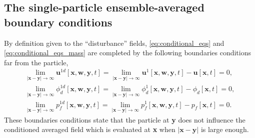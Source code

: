 \subsection{The single-particle ensemble-averaged boundary conditions}


By definition given to the ``disturbance'' fields, \ref{eq:conditional_eqs} and \ref{eq:conditional_eqs_mass} are completed by the following boundaries conditions far from the particle, 
\begin{align}
    \lim_{|\textbf{x}-\textbf{y}|\to\infty} 
    \textbf{u}^{1d}[\textbf{x},\textbf{w},\textbf{y},t] 
    = 
    \lim_{|\textbf{x}-\textbf{y}|\to\infty} 
    \textbf{u}^{1}[\textbf{x},\textbf{w},\textbf{y},t] 
    - \textbf{u}[\textbf{x},t] 
    = 0, \\
    \lim_{|\textbf{x}-\textbf{y}|\to\infty} 
    \phi_d^{1d}[\textbf{x},\textbf{w},\textbf{y},t] 
    = 
    \lim_{|\textbf{x}-\textbf{y}|\to\infty} 
    \phi_d^{1}[\textbf{x},\textbf{w},\textbf{y},t] 
    - \phi_d[\textbf{x},t] 
    = 0, \\
    \lim_{|\textbf{x}-\textbf{y}|\to\infty} 
    p^{1d}_f[\textbf{x},\textbf{w},\textbf{y},t] 
    = 
    \lim_{|\textbf{x}-\textbf{y}|\to\infty} 
    p^{1}_f[\textbf{x},\textbf{w},\textbf{y},t] 
    - p_f[\textbf{x},t] 
    = 0. 
    \label{eq:boundary_at_infinity}
\end{align}
These boundaries conditions state that the particle at \textbf{y} does not influence the conditioned averaged field which is evaluated at \textbf{x} when $|\textbf{x}-\textbf{y}|$ is large enough. 

